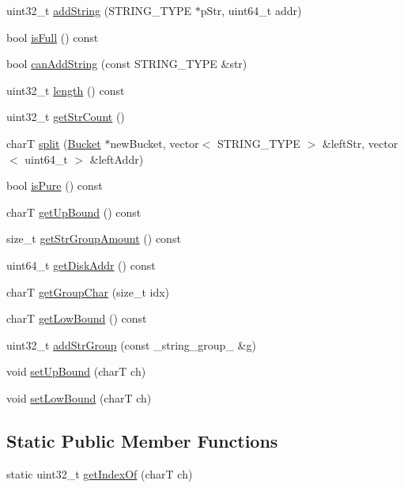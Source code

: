 \begin{CompactItemize}
\item 
uint32\_\-t \hyperlink{classBucket_dbd9d27161fe66c47cdd51913153b7b3}{addString} (STRING\_\-TYPE $\ast$pStr, uint64\_\-t addr)
\item 
bool \hyperlink{classBucket_9f4c866f5d4b0d165491a2c563831350}{isFull} () const 
\item 
bool \hyperlink{classBucket_e7e4d1a75e5d64a82f82fd0299e263a1}{canAddString} (const STRING\_\-TYPE \&str)
\item 
uint32\_\-t \hyperlink{classBucket_5bb12720211df4d328ad406b4db73ba8}{length} () const 
\item 
uint32\_\-t \hyperlink{classBucket_a857290e6bcc13c88f294661cb9b2443}{getStrCount} ()
\item 
charT \hyperlink{classBucket_0400e7c792f912c5d884cc15b0126fea}{split} (\hyperlink{classBucket}{Bucket} $\ast$newBucket, vector$<$ STRING\_\-TYPE $>$ \&leftStr, vector$<$ uint64\_\-t $>$ \&leftAddr)
\item 
bool \hyperlink{classBucket_f155c7047ad233e70dd96126ef6dad03}{isPure} () const 
\item 
charT \hyperlink{classBucket_bc2e307c528d04148b35e72561740773}{getUpBound} () const 
\item 
size\_\-t \hyperlink{classBucket_7a6175d28ea21fa425d2b03b0591f543}{getStrGroupAmount} () const 
\item 
uint64\_\-t \hyperlink{classBucket_f32dfcedc5cf09e7acb78cd250c4f1c8}{getDiskAddr} () const 
\item 
charT \hyperlink{classBucket_17e0be9a920b5a61c1eb69d044bedd03}{getGroupChar} (size\_\-t idx)
\item 
charT \hyperlink{classBucket_cf5d42452cf0850e1455a8bc8d890c96}{getLowBound} () const 
\item 
uint32\_\-t \hyperlink{classBucket_46d5394d7cef3979bafb66e9163179a1}{addStrGroup} (const \_\-string\_\-group\_\- \&g)
\item 
void \hyperlink{classBucket_b84ee68f2451e8b74f7bbd0ec40f6815}{setUpBound} (charT ch)
\item 
void \hyperlink{classBucket_3e9104ad711ed5e5099e2b5079c06f6a}{setLowBound} (charT ch)
\end{CompactItemize}
\subsection*{Static Public Member Functions}
\begin{CompactItemize}
\item 
static uint32\_\-t \hyperlink{classBucket_8c5caaa48ffdbaa747ccfa03a102ed52}{getIndexOf} (charT ch)
\end{CompactItemize}
